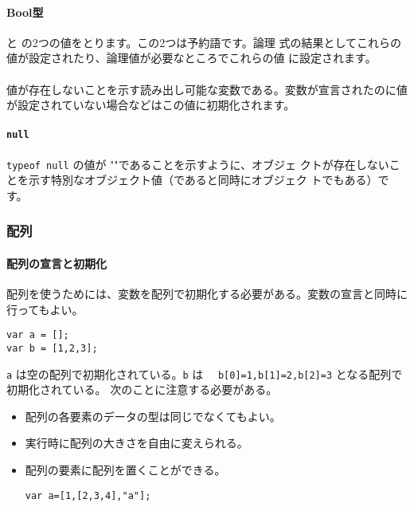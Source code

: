 \paragraph{Bool型}
 と  の2つの値をとります。この2つは予約語です。論理
式の結果としてこれらの値が設定されたり、論理値が必要なところでこれらの値
に設定されます。
\paragraph{\protect{}}
値が存在しないことを示す読み出し可能な変数である。変数が宣言されたのに値
が設定されていない場合などはこの値に初期化されます。
\paragraph{\protect\texttt{null}}
\texttt{typeof null} の値が ""であることを示すように、オブジェ
クトが存在しないことを示す特別なオブジェクト値（であると同時にオブジェク
トでもある）です。
\subsubsection{配列}
\paragraph{配列の宣言と初期化}
配列を使うためには、変数を配列で初期化する必要がある。変数の宣言と同時に
行ってもよい。
\begin{verbatim}
var a = [];
var b = [1,2,3];
\end{verbatim}
\verb+a+ は空の配列で初期化されている。\verb+b+ は　
\verb+b[0]=1,b[1]=2,b[2]=3+ となる配列で初期化されている。
次のことに注意する必要がある。
\begin{itemize}
 \item 配列の各要素のデータの型は同じでなくてもよい。
 \item 実行時に配列の大きさを自由に変えられる。
 \item 配列の要素に配列を置くことができる。
\begin{verbatim}
var a=[1,[2,3,4],"a"];
\end{verbatim}
\end{itemize}
